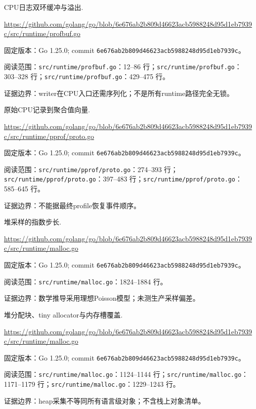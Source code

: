 \documentclass[UTF8,fontset=fandol,openany,11pt]{ctexbook}
\begin{document}
\begin{thebibliography}{999}
 CPU日志双环缓冲与溢出.\par
\url{https://github.com/golang/go/blob/6e676ab2b809d46623acb5988248d95d1eb7939c/src/runtime/profbuf.go}\par
{\small\raggedright 固定版本：Go 1.25.0; commit \texttt{6e676ab2\allowbreak{}b809d466\allowbreak{}23acb598\allowbreak{}8248d95d\allowbreak{}1eb7939c}。\par
阅读范围：\nolinkurl{src/runtime/profbuf.go}：12–86 行；\nolinkurl{src/runtime/profbuf.go}：303–328 行；\nolinkurl{src/runtime/profbuf.go}：429–475 行。\par
证据边界：writer在CPU入口还需序列化；不是所有runtime路径完全无锁。
}

 原始CPU记录到聚合值向量.\par
\url{https://github.com/golang/go/blob/6e676ab2b809d46623acb5988248d95d1eb7939c/src/runtime/pprof/proto.go}\par
{\small\raggedright 固定版本：Go 1.25.0; commit \texttt{6e676ab2\allowbreak{}b809d466\allowbreak{}23acb598\allowbreak{}8248d95d\allowbreak{}1eb7939c}。\par
阅读范围：\nolinkurl{src/runtime/pprof/proto.go}：274–393 行；\nolinkurl{src/runtime/pprof/proto.go}：397–483 行；\nolinkurl{src/runtime/pprof/proto.go}：585–645 行。\par
证据边界：不能据最终profile恢复事件顺序。
}

 堆采样的指数步长.\par
\url{https://github.com/golang/go/blob/6e676ab2b809d46623acb5988248d95d1eb7939c/src/runtime/malloc.go}\par
{\small\raggedright 固定版本：Go 1.25.0; commit \texttt{6e676ab2\allowbreak{}b809d466\allowbreak{}23acb598\allowbreak{}8248d95d\allowbreak{}1eb7939c}。\par
阅读范围：\nolinkurl{src/runtime/malloc.go}：1824–1884 行。\par
证据边界：数学推导采用理想Poisson模型；未测生产采样偏差。
}

 堆分配块、tiny allocator与内存槽覆盖.\par
\url{https://github.com/golang/go/blob/6e676ab2b809d46623acb5988248d95d1eb7939c/src/runtime/malloc.go}\par
{\small\raggedright 固定版本：Go 1.25.0; commit \texttt{6e676ab2\allowbreak{}b809d466\allowbreak{}23acb598\allowbreak{}8248d95d\allowbreak{}1eb7939c}。\par
阅读范围：\nolinkurl{src/runtime/malloc.go}：1124–1144 行；\nolinkurl{src/runtime/malloc.go}：1171–1179 行；\nolinkurl{src/runtime/malloc.go}：1229–1243 行。\par
证据边界：heap采集不等同所有语言级对象；不含栈上对象清单。
}


\end{thebibliography}
\end{document}
